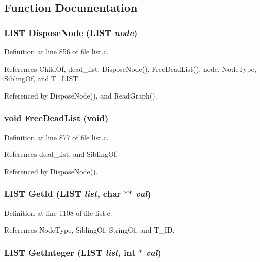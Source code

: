 \subsection{Function Documentation}
\subsubsection{\setlength{\rightskip}{0pt plus 5cm}\bf{LIST} Dispose\-Node (\bf{LIST} {\em node})}\label{list_8h_b1cb91e33a6f7af3a3cd4d93beb46128}




Definition at line 856 of file list.c.

References Child\-Of, dead\_\-list, Dispose\-Node(), Free\-Dead\-List(), node, Node\-Type, Sibling\-Of, and T\_\-LIST.

Referenced by Dispose\-Node(), and Read\-Graph().
\subsubsection{\setlength{\rightskip}{0pt plus 5cm}void Free\-Dead\-List (void)}\label{list_8h_2e715e1045114ce24d80ffa6c7d77167}




Definition at line 877 of file list.c.

References dead\_\-list, and Sibling\-Of.

Referenced by Dispose\-Node().
\subsubsection{\setlength{\rightskip}{0pt plus 5cm}\bf{LIST} Get\-Id (\bf{LIST} {\em list}, char $\ast$$\ast$ {\em val})}\label{list_8h_5189d4c03dfea6104c2f48b2fc5eb828}




Definition at line 1108 of file list.c.

References Node\-Type, Sibling\-Of, String\-Of, and T\_\-ID.
\subsubsection{\setlength{\rightskip}{0pt plus 5cm}\bf{LIST} Get\-Integer (\bf{LIST} {\em list}, int $\ast$ {\em val})}\label{list_8h_53c6fbf833b124ea448e957301340d90}




